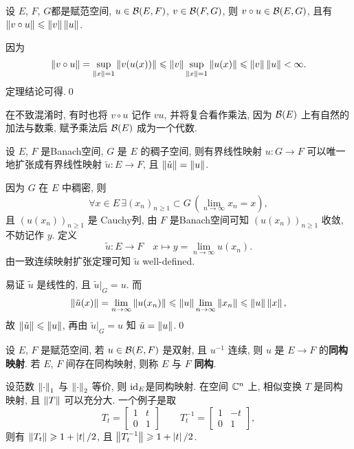 \begin{Theorem}
	设 $ E $, $ F $, $ G $都是赋范空间,  $ u\in\mathcal{B}(E, F) $, $ v\in\mathcal{B}(F, G) $, 则 $ v\circ u\in\mathcal{B}(E, G) $, 且有 $ \left\| v\circ u \right\|\leqslant\left\| v \right\|\left\| u \right\| $.
\end{Theorem}
\begin{Proof}
	因为
	\[
		\left\| v\circ u \right\|=\sup_{\left\| x \right\|=1}\left\| v(u(x)) \right\|\leqslant\left\| v \right\|\sup_{\left\| x \right\|=1}\left\| u(x) \right\|\leqslant\left\| v \right\|\left\| u \right\|<\infty.
	\]
	定理结论可得.\qed
\end{Proof}

\begin{Remark}
	在不致混淆时, 有时也将 $ v\circ u $ 记作 $ vu $, 并将复合看作乘法, 因为 $ \mathcal{B}(E) $ 上有自然的加法与数乘, 赋予乘法后 $ \mathcal{B}(E) $ 成为一个代数.
\end{Remark}

\begin{Theorem}
	设 $ E $, $ F $ 是Banach空间,  $ G $ 是 $ E $ 的稠子空间, 则有界线性映射 $ u: G\to F $ 可以唯一地扩张成有界线性映射 $ \tilde{u}:E\to F $, 且 $ \left\| \tilde{u} \right\|=\left\| u \right\| $.
\end{Theorem}
\begin{Proof}
	因为 $ G $ 在 $ E $ 中稠密, 则
	\[
		\forall x\in E\,\exists(x_{n})_{n\geqslant1}\subset G\,(\lim_{n\to\infty}x_{n}=x),
	\]
	且 $ (u(x_{n}))_{n\geqslant1} $ 是 Cauchy列, 由 $ F $ 是Banach空间可知 $ (u(x_{n}))_{n\geqslant1} $ 收敛, 不妨记作 $ y $. 定义
	\[
		\tilde{u}: E\to F\quad x\mapsto y=\lim_{n\to\infty}u(x_{n}).
	\]
	由一致连续映射扩张定理可知 $ \tilde{u} $ well-defined.

	易证 $ \tilde{u} $ 是线性的, 且 $ \tilde{u}|_{G}=u $. 而
	\[
		\left\| \tilde{u}(x) \right\|=\lim_{n\to\infty}\left\| u(x_{n}) \right\|\leqslant\left\| u \right\|\lim_{n\to\infty}\left\| x_{n} \right\|\leqslant\left\| u \right\|\left\| x \right\|,
	\]
	故 $ \left\| \tilde{u} \right\|\leqslant\left\| u \right\| $, 再由 $ \tilde{u}|_{G}=u $ 知 $ \tilde{u}=\left\| u \right\| $.\qed

\end{Proof}

\begin{Definition}[同构]\label{def:同构}
	设 $ E $, $ F $ 是赋范空间, 若 $ u\in\mathcal{B}(E, F) $ 是双射, 且 $ u^{-1} $ 连续, 则 $ u $ 是 $ E\to F $ 的\textbf{同构映射}. 若 $ E $, $ F $ 间存在同构映射, 则称 $ E $ 与 $ F $ \textbf{同构}.
\end{Definition}

\begin{Remark}
	设范数 $ \left\| \cdot \right\|_{1} $ 与 $ \left\| \cdot \right\|_{2} $ 等价, 则 $ \mathrm{id}_{E} $是同构映射. 在空间 $ \mathbb{C}^{n} $ 上, 相似变换 $ T $ 是同构映射, 且 $ \left\| T \right\| $ 可以充分大. 一个例子是取
	\[
		T_{t}=\begin{bmatrix}
			1 & t \\
			0 & 1
		\end{bmatrix}
		\qquad
		T_{t}^{-1}=\begin{bmatrix}
			1 & -t \\
			0 & 1
		\end{bmatrix},
	\]
	则有 $ \left\| T_{t} \right\|\geqslant1+\left| t \right| /2 $, 且 $ \left\| T_{t}^{-1} \right\|\geqslant 1+\left| t \right| /2 $.
\end{Remark}

